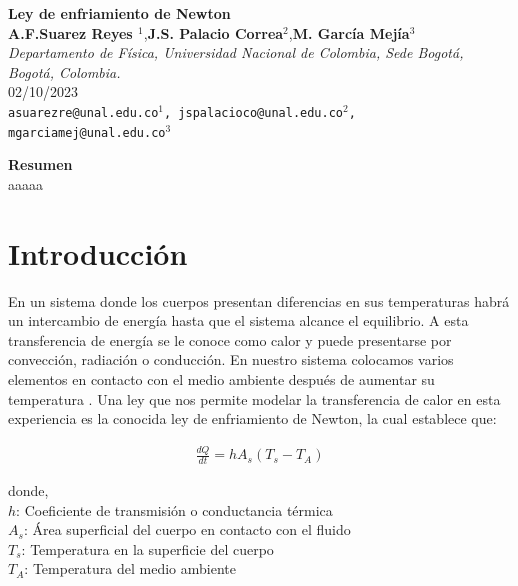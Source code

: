 \documentclass{article}
\date{}
\begin{document}
 
     \begin{center}
        {\Large \textbf{Ley de enfriamiento de Newton}}\\
        \vspace{5mm}
        {\small \textbf{A.F.Suarez Reyes $^{1}$},\textbf{J.S. Palacio Correa$^{2}$},\textbf{M. García Mejía$^{3}$} \\
        \vspace{3mm}}
        {\small \textit{Departamento de Física, Universidad Nacional de Colombia, Sede Bogotá, Bogotá, Colombia.}}\\
        \vspace{3mm}
        {\small 02/10/2023}\\
        \vspace{3mm}
        {\texttt{\textup{asuarezre@unal.edu.co$^{1}$, jspalacioco@unal.edu.co$^2$, mgarciamej@unal.edu.co$^{3}$}}} \\
    \end{center}
    
    
    \vspace{5mm}

{\large \textbf{Resumen}}\\
aaaaa


\textit{ \hspace{2mm}}


\section{Introducción}

En un sistema donde los cuerpos presentan diferencias en sus temperaturas habrá un intercambio de energía hasta que el sistema alcance el equilibrio. A esta transferencia de energía  se le conoce como calor y puede presentarse por convección, radiación o conducción. 
En nuestro sistema colocamos varios elementos en contacto con el medio ambiente después de aumentar su temperatura . Una ley que nos permite modelar la transferencia de calor en esta experiencia es la conocida ley de enfriamiento de Newton, la cual establece que: 

\begin{align}
    \frac{dQ}{dt} = hA_s(T_s-T_A) 
\end{align}

donde,  \\ 
$h$:  Coeficiente de transmisión o conductancia térmica  \\ 
$A_s$: Área superficial del cuerpo en contacto con el fluido \\ 
$T_s$: Temperatura en la superficie del cuerpo \\ 
$T_A$: Temperatura del medio ambiente
\end{document}
